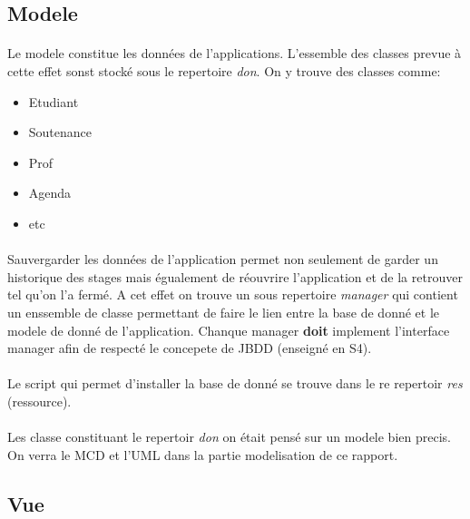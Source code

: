 \documentclass[a4paper,10pt]{report}
\begin{document}
\subsection{Modele}

	\paragraph*{}
	Le modele constitue les données de l'applications. L'essemble des classes prevue à cette effet sonst stocké sous le repertoire \textit{don}. On y trouve des classes comme:
	\begin{itemize}
		\item Etudiant
		\item Soutenance
		\item Prof
		\item Agenda
		\item etc
	\end{itemize} 

	\paragraph*{}
	Sauvergarder les données de l'application permet non seulement de garder un historique des stages mais égualement de réouvrire l'application et de la retrouver tel qu'on l'a fermé. A cet effet on trouve un sous repertoire \textit{manager} qui contient un enssemble de classe permettant de faire le lien entre la base de donné et le modele de donné de l'application. Chanque manager \textbf{doit} implement l'interface manager afin de respecté le concepete de JBDD (enseigné en S4).

	\paragraph*{}
	Le script qui permet d'installer la base de donné se trouve dans le re repertoir \textit{res} (ressource).

	\paragraph*{}
	Les classe constituant le repertoir \textit{don} on était pensé sur un modele bien precis. On verra le MCD et l'UML dans la partie modelisation de ce rapport.

\subsection{Vue}
\end{document}

